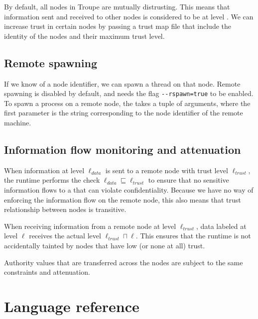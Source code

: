 By default, all nodes in Troupe are mutually distrusting. This means that 
information sent and received to other nodes is considered to be at level \lev{}.
We can increase trust in certain nodes by 
passing a trust map file that include the identity of the nodes and their maximum
trust level.


    
\subsection{Remote spawning}
If we know of a node identifier, we can spawn a thread on that node. Remote spawning is 
disabled by default, and needs the flag {\verb|--rspawn=true|} to be enabled.
%
To spawn a process on a remote node, the  takes a tuple of arguments,
where the first parameter is the string corresponding to the node identifier of the remote machine.


\subsection{Information flow monitoring and attenuation}
When information at level $\ell_{\mathit{data}}$ is sent to a remote node with trust level 
$\ell_{\mathit{trust}}$, the runtime performs the check
$\ell_{\mathit{data}} \sqsubseteq \ell_{\mathit{trust}}$ to ensure that no sensitive information 
flows to a that can violate confidentiality. Because we have no way of enforcing the 
information flow on the remote node, this also means that 
trust relationship between nodes is transitive.

When receiving information from a remote node at level $\ell_{\mathit{trust}}$, 
data labeled at level $\ell$ receives the actual level $\ell_{\mathit{trust}} \sqcap \ell$. 
This ensures that the runtime is not accidentally tainted by nodes that have low (or none at all) trust.

Authority values that are transferred across the nodes are subject to the same constraints and attenuation.



\clearpage
\appendix
\section{Language reference}

